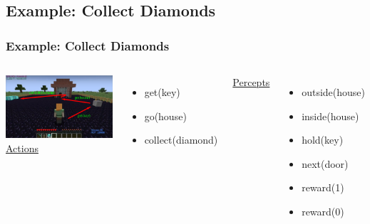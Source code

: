 \documentclass[aspectratio=169]{beamer}
\begin{document}
\begin{frame}

\end{frame}

\subsection{Example: Collect Diamonds}

\begin{frame}
  \frametitle{Example: Collect Diamonds}
  \begin{columns}
    \column{4.4in}
    \includegraphics[scale=0.33]{pictures/minecraft-arrows.png}
    \column{1.7in}
    \underline{Actions}
      \begin{itemize}
      \item get(key)
      \item go(house)
      \item collect(diamond)
      \end{itemize}
    \underline{Percepts}
      \begin{itemize}
      \item outside(house)
      \item inside(house)
      \item hold(key)
      \item next(door)
      \item reward(1)
      \item reward(0)
      \end{itemize}
  \end{columns}
\end{frame}
\end{document}
